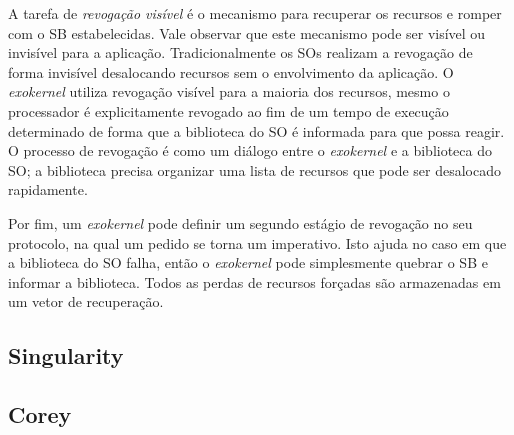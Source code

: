 A tarefa de \emph{revogação visível} é o mecanismo para recuperar os recursos
e romper com o SB estabelecidas. Vale observar que este mecanismo pode ser
visível ou invisível para a aplicação. Tradicionalmente os SOs realizam a
revogação de forma invisível desalocando recursos sem o envolvimento da
aplicação. O \emph{exokernel} utiliza revogação visível para a maioria dos
recursos, mesmo o processador é explicitamente revogado ao fim de um tempo de
execução determinado de forma que a biblioteca do SO é informada para que possa
reagir. O processo de revogação é como um diálogo entre o \emph{exokernel} e a
biblioteca do SO; a biblioteca precisa organizar uma lista de recursos que pode
ser desalocado rapidamente.

Por fim, um \emph{exokernel} pode definir um segundo estágio de revogação no
seu protocolo, na qual um pedido se torna um imperativo. Isto ajuda no caso em
que a biblioteca do SO falha, então o \emph{exokernel} pode simplesmente
quebrar o SB e informar a biblioteca. Todos as perdas de recursos forçadas são
armazenadas em um vetor de recuperação.


\subsection{Singularity}

\subsection{Corey}
